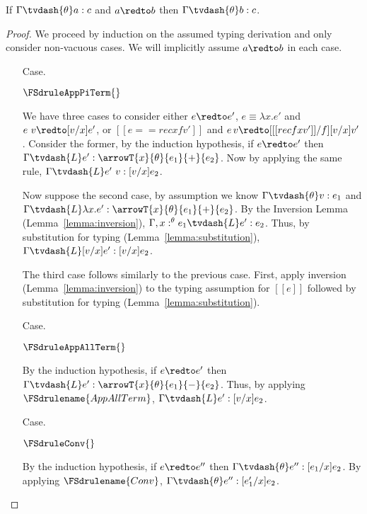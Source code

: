 \begin{thm}[Preservation]
  \label{thm:preservation}
  If $\Gamma \tvdash{\theta} a:c$ and $a \redto b$ then $\Gamma \tvdash{\theta} b:c$.
\end{thm}
\begin{proof}
  We proceed by induction on the assumed typing derivation and only consider non-vacuous 
  cases.  We will implicitly assume $a \redto b$ in each case.

  \begin{itemize}
  \item[Case.]\ \\
    \begin{center}
      $\FSdruleAppPiTerm{}$
    \end{center}
    We have three cases to consider either $e \redto e'$, $e \equiv \lambda x.e'$
    and $e\ v \redto [v/x]e'$, or $[[e == rec x f v']]$ and $e\,v \redto [ [[rec f x v']]/f][v/x]v'$.  
    Consider the former, by the induction hypothesis, if $e \redto e'$ then 
    $\Gamma \tvdash{L} e':\arrowT{x}{\theta}{e_1}{+}{e_2}$.  Now by applying the same
    rule, $\Gamma \tvdash{L} e'\ v:[v/x]e_2$.
    
    \noindent
    Now suppose the second case, by assumption we know $\Gamma \tvdash{\theta} v:e_1$ and
    $\Gamma \tvdash{L} \lambda x.e':\arrowT{x}{\theta}{e_1}{+}{e_2}$. By the Inversion Lemma (Lemma~\ref{lemma:inversion}), 
    $\Gamma,x:^\theta e_1 \tvdash{L} e':e_2$.  Thus, by substitution for typing (Lemma~\ref{lemma:substitution}),
    $\Gamma \tvdash{L}[v/x]e':[v/x]e_2$.

    The third case follows similarly to the previous case.  First,
    apply inversion (Lemma~\ref{lemma:inversion}) to the typing
    assumption for $[[e]]$ followed by substitution for typing (Lemma~\ref{lemma:substitution}).

  \item[Case.]\ \\
    \begin{center}
      $\FSdruleAppAllTerm{}$
    \end{center}
    By the induction hypothesis, if $e \redto e'$ then 
    $\Gamma \tvdash{L} e':\arrowT{x}{\theta}{e_1}{-}{e_2}$.  Thus, by applying 
    $\FSdrulename{AppAllTerm}$, $\Gamma \tvdash{L} e':[v/x]e_2$.
    
  \item[Case.]\ \\
    \begin{center}
      $\FSdruleConv{}$
    \end{center}
    By the induction hypothesis, if $e \redto e''$ then $\Gamma \tvdash{\theta} e'':[e_1/x]e_2$.
    By applying $\FSdrulename{Conv}$, $\Gamma \tvdash{\theta} e'':[e'_1/x]e_2$.


\end{itemize}
\end{proof}
